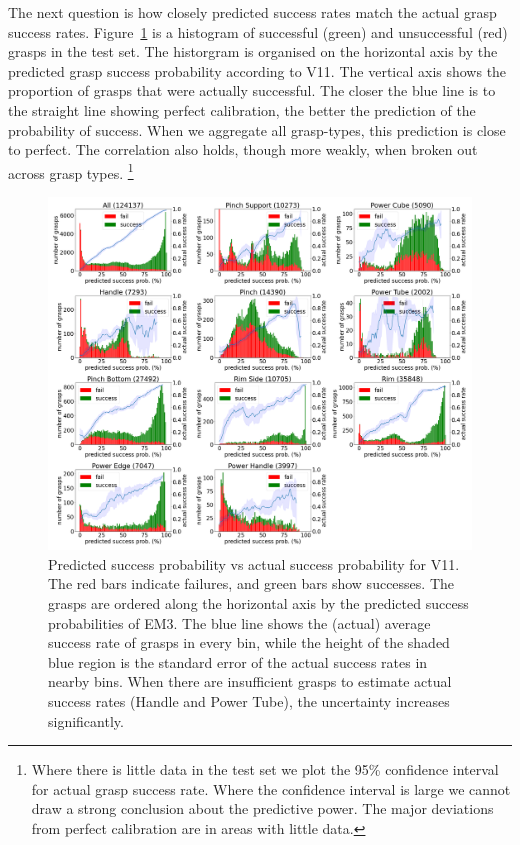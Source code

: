 The next question is how closely predicted success rates match the actual grasp success rates. Figure~\ref{fig:calibrate} is a histogram of successful (green) and unsuccessful (red) grasps in the test set. The historgram is organised on the horizontal axis by the predicted grasp success probability according to V11. The vertical axis shows the proportion of grasps that were actually successful. The closer the blue line is to the straight line showing perfect calibration, the better the prediction of the probability of success. When we aggregate all grasp-types, this prediction is close to perfect. The correlation also holds, though more weakly, when broken out across grasp types. \footnote{Where there is little data in the test set we plot the 95\% confidence interval for actual grasp success rate. Where the confidence interval is large we cannot draw a strong conclusion about the predictive power. The major deviations from perfect calibration are in areas with little data.}

\begin{figure}[h]
\centering
\includegraphics[width=1.02\columnwidth]{images/post-analysis/V11_pred_success_vs_success.png}
\caption{Predicted success probability vs actual success probability for V11. The red bars indicate failures, and green bars show successes. The grasps are ordered along the horizontal axis by the predicted success probabilities of EM3. The blue line shows the (actual) average success rate of grasps in every bin, while the height of the shaded blue region is the standard error of the actual success rates in nearby bins. When there are insufficient grasps to estimate actual success rates (Handle and Power Tube), the uncertainty increases significantly.}
\label{fig:calibrate}
\end{figure}

